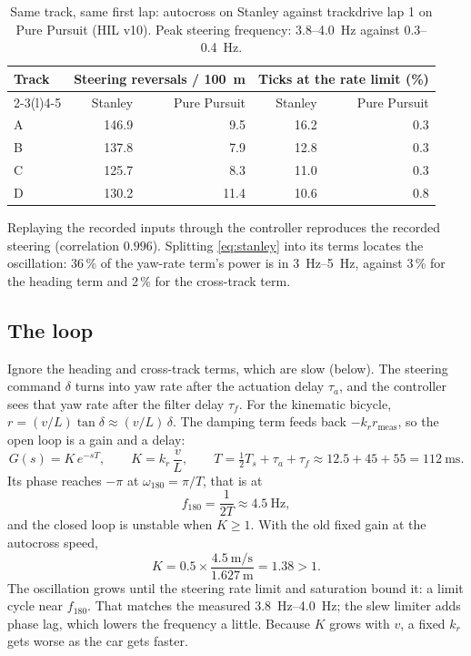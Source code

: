 \documentclass[11pt,a4paper]{article}
\begin{document}
\begin{table}[h]
\centering\small
\begin{tabular}{@{}lrrrr@{}}
\toprule
Track & \multicolumn{2}{c}{Steering reversals / \SI{100}{\metre}} & \multicolumn{2}{c}{Ticks at the rate limit (\%)}\\
\cmidrule(lr){2-3}\cmidrule(l){4-5}
 & Stanley & Pure Pursuit & Stanley & Pure Pursuit \\
\midrule
A & 146.9 & 9.5 & 16.2 & 0.3 \\
B & 137.8 & 7.9 & 12.8 & 0.3 \\
C & 125.7 & 8.3 & 11.0 & 0.3 \\
D & 130.2 & 11.4 & 10.6 & 0.8 \\
\bottomrule
\end{tabular}
\caption{Same track, same first lap: autocross on Stanley against trackdrive lap 1 on
Pure Pursuit (HIL v10). Peak steering frequency: \SI{3.8}{}--\SI{4.0}{\hertz} against
\SI{0.3}{}--\SI{0.4}{\hertz}.}
\label{tab:lap1}
\end{table}

Replaying the recorded inputs through the controller reproduces the recorded steering
(correlation $0.996$). Splitting \cref{eq:stanley} into its terms locates the oscillation:
36\,\% of the yaw-rate term's power is in \SIrange{3}{5}{\hertz}, against 3\,\% for the
heading term and 2\,\% for the cross-track term.

\subsection{The loop}
Ignore the heading and cross-track terms, which are slow (below). The steering command
$\delta$ turns into yaw rate after the actuation delay $\tau_a$, and the controller sees
that yaw rate after the filter delay $\tau_f$. For the kinematic bicycle,
$r = (v/L)\tan\delta \approx (v/L)\,\delta$. The damping term feeds back
$-k_r r_{\text{meas}}$, so the open loop is a gain and a delay:
\begin{equation}
G(s) = K\,e^{-sT}, \qquad K = k_r\,\frac{v}{L}, \qquad
T = \tfrac12 T_s + \tau_a + \tau_f \approx 12.5 + 45 + 55 = \SI{112}{\milli\second}.
\label{eq:loop}
\end{equation}
Its phase reaches $-\pi$ at $\omega_{180} = \pi / T$, that is at
\begin{equation}
f_{180} = \frac{1}{2T} \approx \SI{4.5}{\hertz},
\end{equation}
and the closed loop is unstable when $K \ge 1$. With the old fixed gain at the autocross
speed,
\begin{equation}
K = 0.5 \times \frac{\SI{4.5}{\metre\per\second}}{\SI{1.627}{\metre}} = 1.38 > 1 .
\end{equation}
The oscillation grows until the steering rate limit and saturation bound it: a limit
cycle near $f_{180}$. That matches the measured \SIrange{3.8}{4.0}{\hertz}; the slew
limiter adds phase lag, which lowers the frequency a little. Because $K$ grows with $v$, a
fixed $k_r$ gets worse as the car gets faster.
\end{document}

